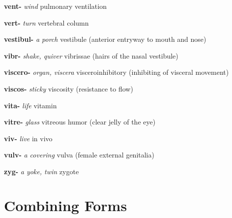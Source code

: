 \documentclass[10pt]{article}
\begin{document}
\begin{multicols}{2}
\begin{hangparas}{10pt}{1}
 \textbf{vent-} \textit{wind} pulmonary ventilation \par
 \textbf{vert-} \textit{turn} vertebral column \par
 \textbf{vestibul-} \textit{a porch} vestibule (anterior entryway to mouth and nose) \par
 \textbf{vibr-} \textit{shake, quiver} vibrissae (hairs of the nasal vestibule) \par
 \textbf{viscero-} \textit{organ, viscera} visceroinhibitory (inhibiting of visceral movement) \par
 \textbf{viscos-} \textit{sticky} viscosity (resistance to flow) \par
 \textbf{vita-} \textit{life} vitamin \par
 \textbf{vitre-} \textit{glass} vitreous humor (clear jelly of the eye) \par
 \textbf{viv-} \textit{live} in vivo \par
 \textbf{vulv-} \textit{a covering} vulva (female external genitalia) \par
 \textbf{zyg-} \textit{a yoke, twin} zygote
 \end{hangparas}

 \normalsize
 \sectionspace
 \section*{Combining Forms}
 \sectionspace
 \footnotesize


\end{multicols}
\end{document}
